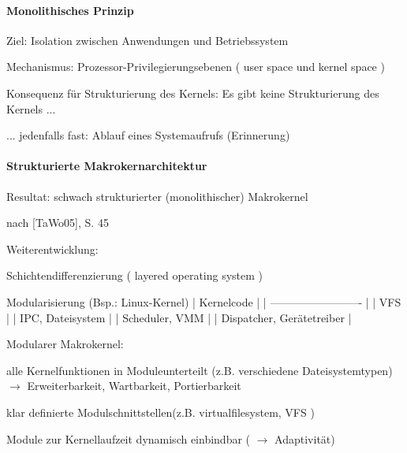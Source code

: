 \documentclass[a4paper]{article}
\begin{document}
\begin{multicols}{3}
    \paragraph{Monolithisches Prinzip}

    \begin{itemize*}
        \item
        Ziel: Isolation zwischen Anwendungen und Betriebssystem
        \item
        Mechanismus: Prozessor-Privilegierungsebenen ( user space und kernel
        space )
        \item
        Konsequenz für Strukturierung des Kernels: Es gibt keine
        Strukturierung des Kernels ...
        \item
        ... jedenfalls fast: Ablauf eines Systemaufrufs (Erinnerung)
    \end{itemize*}


    \paragraph{Strukturierte
        Makrokernarchitektur}

    \begin{itemize*}
        \item
        Resultat: schwach strukturierter (monolithischer) Makrokernel
        \item
        \begin{itemize*}
            \item nach [TaWo05], S. 45
        \end{itemize*}
        \item
        Weiterentwicklung:
        \item
        Schichtendifferenzierung ( layered operating system )
        \item
        Modularisierung (Bsp.: Linux-Kernel) | Kernelcode |
        |
        -------------------------
        | | VFS | | IPC, Dateisystem
        | | Scheduler, VMM | | Dispatcher,
        Gerätetreiber |
        \item
        Modularer Makrokernel:
        \item
        alle Kernelfunktionen in Moduleunterteilt (z.B. verschiedene
        Dateisystemtypen) $\rightarrow$ Erweiterbarkeit,
        Wartbarkeit, Portierbarkeit
        \item
        klar definierte Modulschnittstellen(z.B. virtualfilesystem, VFS )
        \item
        Module zur Kernellaufzeit dynamisch einbindbar
        ( $\rightarrow$ Adaptivität)
    \end{itemize*}



\end{multicols}
\end{document}
